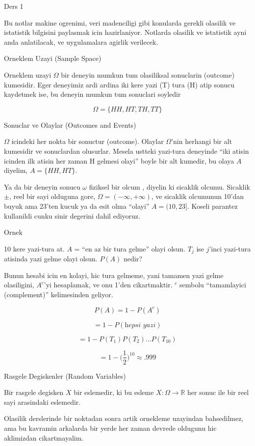 \documentclass[12pt,fleqn]{article}\usepackage{../common}
\begin{document}
Ders 1

Bu notlar makine ogrenimi, veri madenciligi gibi konularda gerekli olasilik
ve istatistik bilgisini paylasmak icin hazirlaniyor. Notlarda olasilik ve
istatistik ayni anda anlatilacak, ve uygulamalara agirlik verilecek. 

Orneklem Uzayi (Sample Space)

Orneklem uzayi $\Omega$ bir deneyin mumkun tum olasiliksal sonuclarin
(outcome) kumesidir. Eger deneyimiz ardi ardina iki kere yazi (T) tura (H)
atip sonucu kaydetmek ise, bu deneyin mumkun tum sonuclari soyledir

\[\Omega = \{HH,HT,TH,TT\} \]

Sonuclar ve Olaylar (Outcomes and Events)

$\Omega$ icindeki her nokta bir sonuctur (outcome). Olaylar $\Omega$'nin
herhangi bir alt kumesidir ve sonuclardan olusurlar. Mesela ustteki
yazi-tura deneyinde ``iki atisin icinden ilk atisin her zaman H gelmesi
olayi'' boyle bir alt kumedir, bu olaya $A$ diyelim, $A =
\{HH,HT\}$.

Ya da bir deneyin sonucu $\omega$ fiziksel bir olcum , diyelin ki sicaklik
olcumu. Sicaklik $\pm$, reel bir sayi olduguna gore, $\Omega = (-\infty,
+\infty)$, ve
sicaklik olcumunun 10'dan buyuk ama 23'ten kucuk ya da esit
olma ``olayi'' $A = (10,23]$. Koseli parantez kullanildi cunku sinir
degerini dahil ediyoruz. 

Ornek 

10 kere yazi-tura at. $A$ = ``en az bir tura gelme'' olayi olsun. $T_j$ ise
$j$'inci yazi-tura atisinda yazi gelme olayi olsun. $P(A)$ nedir? 

Bunun hesabi icin en kolayi, hic tura gelmeme, yani tamamen yazi gelme
olasiligini, $A^c$'yi hesaplamak, ve onu 1'den cikartmaktir. $^c$ sembolu
``tamamlayici (complement)'' kelimesinden geliyor.

\[ P(A) = 1 - P(A^c) \]

\[ = 1 - P(\textit{hepsi yazi}) \]

\[ = 1-P(T_1)P(T_2)...P(T_{10}) \]

\[ = 1 - \bigg(\frac{1}{2}\bigg)^{10} \approx .999 \]


Rasgele Degiskenler (Random Variables)

Bir rasgele degisken $X$ bir eslemedir, ki bu esleme $X: \Omega \to \mathbb{R}$
her sonuc ile bir reel sayi arasindaki eslemedir. 

Olasilik derslerinde bir noktadan sonra artik ornekleme uzayindan
bahsedilmez, ama bu kavramin arkalarda bir yerde her zaman devrede oldugunu
hic aklimizdan cikartmayalim. 
\end{document}
